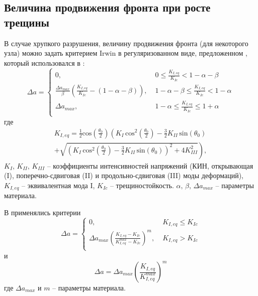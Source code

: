 \subsection{Величина продвижения фронта при росте трещины}
В случае хрупкого разрушения, величину продвижения фронта (для некоторого узла) можно задать критерием Irwin \cite{Irwin1997} в регуляризованном виде, предложенном \cite{Lazarus2003}, который использовался в \cite{Gupta2017,Duarte2019,Duarte2020_validation,Duarte2020}:
\begin{equation}
\Delta a =
\begin{cases}
0, & \mathrm{}\;0\leqslant \frac{K_{I,eq}}{K_{Ic}} < 1-\alpha-\beta \\
\frac{\Delta a_{max}}{\beta}\left(  \frac{K_{I,eq}}{K_{Ic}} - \left( 1-\alpha-\beta \right) \right) , & \mathrm{}\;1-\alpha-\beta \leqslant \frac{K_{I,eq}}{K_{Ic}} < 1-\alpha \\
\Delta a_{max}, & \mathrm{}\;1-\alpha \leqslant \frac{K_{I,eq}}{K_{Ic}} \leqslant 1+\alpha \\
\end{cases}
\label{F:F_propogation1}
\end{equation}
где
\begin{equation}
\begin{gathered}
K_{I,eq} = \frac{1}{2}\mathrm{cos}\left( \frac{\theta_0}{2} \right)
\left(K_I\,\mathrm{cos}^2 \left(\frac{\theta_0}{2}\right)-\frac{3}{2}K_{II}\,\mathrm{sin} \left(\theta_0\right) \right. \\ 
\left. +\sqrt{\left(K_I\,\mathrm{cos}^2 \left(\frac{\theta_0}{2}\right)-\frac{3}{2}K_{II}\,\mathrm{sin} \left(\theta_0\right)\right)^2+4K_{III}^2}
\right),
\end{gathered}
\label{F:F_propogation2}
\end{equation}
$K_{I},\,K_{II},\,K_{III}$ -- коэффициенты интенсивностей напряжений (КИН, открывающая (I), поперечно-сдвиговая (II) и продольно-сдвиговая (III) моды деформаций), $K_{I,eq}$ -- эквивалентная мода I, $K_{Ic}$ -- трещиностойкость. $\alpha,\,\beta,\,\Delta a_{max}$ -- параметры материала.

В \cite{Gupta2014} применялись критерии
\begin{equation}
\Delta a =
\begin{cases}
0, & \mathrm{}\; K_{I,eq}\leqslant K_{Ic} \\
\Delta a_{max}\left(\frac{K_{I,eq}-K_{Ic}}{K_{I,eq}^{max}-K_{Ic}}\right)^m, & \mathrm{}\; K_{I,eq}>K_{Ic}\\
\end{cases}
\label{F:F_propogation3}
\end{equation}
и
\begin{equation}
\Delta a = \Delta a_{max}\left(\frac{K_{I,eq}}{K_{I,eq}^{max}}\right)^m
\label{F:F_propogation4}
\end{equation}
где $\Delta a_{max}$ и $m$ -- параметры материала.
